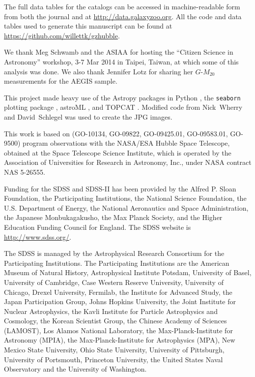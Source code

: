 \documentclass[twocolumn]{aastex6}
\begin{document}
The full data tables for the catalogs can be accessed in machine-readable form from both the journal and at \url{http://data.galaxyzoo.org}. All the code and data tables used to generate this manuscript can be found at \url{https://github.com/willettk/gzhubble}.
 
\acknowledgments

We thank Meg Schwamb and the ASIAA for hosting the ``Citizen Science in Astronomy'' workshop, 3-7 Mar 2014 in Taipei, Taiwan, at which some of this analysis was done. We also thank Jennifer Lotz for sharing her $G$-$M_{20}$ measurements for the AEGIS sample.

This project made heavy use of the Astropy packages in Python \citep{ast13}, the \texttt{seaborn} plotting package \citep{was15}, astroML \citep{van12}, and TOPCAT \citep{tay05,tay11}. Modified code from Nick~Wherry and David~Schlegel was used to create the JPG images. 

This work is based on (GO-10134, GO-09822, GO-09425.01, GO-09583.01, GO-9500) program observations with the NASA/ESA Hubble Space Telescope, obtained at the Space Telescope Science Institute, which is operated by the Association of Universities for Research in Astronomy, Inc., under NASA contract NAS 5-26555. 

Funding for the SDSS and SDSS-II has been provided by the Alfred P. Sloan Foundation, the Participating Institutions, the National Science Foundation, the U.S. Department of Energy, the National Aeronautics and Space Administration, the Japanese Monbukagakusho, the Max Planck Society, and the Higher Education Funding Council for England. The SDSS website is \url{http://www.sdss.org/}. 

The SDSS is managed by the Astrophysical Research Consortium for the Participating Institutions. The Participating Institutions are the American Museum of Natural History, Astrophysical Institute Potsdam, University of Basel, University of Cambridge, Case Western Reserve University, University of Chicago, Drexel University, Fermilab, the Institute for Advanced Study, the Japan Participation Group, Johns Hopkins University, the Joint Institute for Nuclear Astrophysics, the Kavli Institute for Particle Astrophysics and Cosmology, the Korean Scientist Group, the Chinese Academy of Sciences (LAMOST), Los Alamos National Laboratory, the Max-Planck-Institute for Astronomy (MPIA), the Max-Planck-Institute for Astrophysics (MPA), New Mexico State University, Ohio State University, University of Pittsburgh, University of Portsmouth, Princeton University, the United States Naval Observatory and the University of Washington. 
\end{document}
